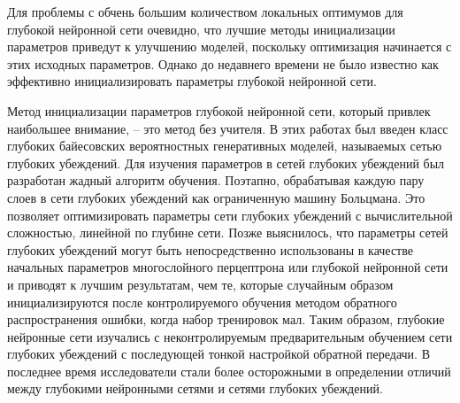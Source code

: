 Для проблемы с обчень большим количеством локальных оптимумов для глубокой нейронной сети очевидно, что лучшие методы инициализации параметров приведут к улучшению моделей, поскольку оптимизация начинается с этих исходных параметров. Однако до недавнего времени не было известно как эффективно инициализировать параметры глубокой нейронной сети.

Метод инициализации параметров глубокой нейронной сети, который привлек наибольшее внимание, -- это метод без учителя. В этих работах был введен класс глубоких байесовских вероятностных генеративных моделей, называемых сетью глубоких убеждений. Для изучения параметров в сетей глубоких убеждений был разработан жадный алгоритм обучения. Поэтапно, обрабатывая каждую пару слоев в сети глубоких убеждений как ограниченную машину Больцмана. Это позволяет оптимизировать параметры сети глубоких убеждений с вычислительной сложностью, линейной по глубине сети. Позже выяснилось, что параметры сетей глубоких убеждений могут быть непосредственно использованы в качестве начальных параметров многослойного перцептрона или глубокой нейронной сети и приводят к лучшим результатам, чем те, которые случайным образом инициализируются после контролируемого обучения методом обратного распространения ошибки, когда набор тренировок мал. Таким образом, глубокие нейронные сети изучались с неконтролируемым предварительным обучением сети глубоких убеждений с последующей тонкой настройкой обратной передачи. В последнее время исследователи стали более осторожными в определении отличий между глубокими нейронными сетями и сетями глубоких убеждений.

